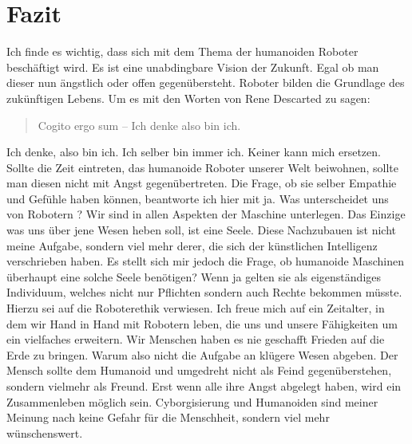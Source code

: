 
\newpage

\chapter{Fazit}
Ich finde es wichtig, dass sich mit dem Thema der humanoiden Roboter beschäftigt wird. Es ist eine unabdingbare Vision der Zukunft. Egal ob man dieser nun ängstlich oder offen gegenübersteht. Roboter bilden die Grundlage des zukünftigen Lebens. Um es mit den Worten von Rene Descarted zu sagen: 
\begin{quote}
	Cogito ergo sum – Ich denke also bin ich.
\end{quote}
Ich denke, also bin ich. Ich selber bin immer ich. Keiner kann mich ersetzen. Sollte die Zeit eintreten, das humanoide Roboter unserer Welt beiwohnen, sollte man diesen nicht mit Angst gegenübertreten. Die Frage, ob sie selber Empathie und Gefühle haben können, beantworte ich hier mit ja. Was unterscheidet uns von Robotern ? Wir sind in allen Aspekten der Maschine unterlegen. Das Einzige was uns über jene Wesen heben soll, ist eine Seele. Diese Nachzubauen ist nicht meine Aufgabe, sondern viel mehr derer, die sich der künstlichen Intelligenz verschrieben haben. Es stellt sich mir jedoch die Frage, ob humanoide Maschinen überhaupt eine solche Seele benötigen? Wenn ja gelten sie als eigenständiges Individuum, welches nicht nur Pflichten sondern auch Rechte bekommen müsste. Hierzu sei auf die Roboterethik verwiesen. Ich freue mich auf ein Zeitalter, in dem wir Hand in Hand mit Robotern leben, die uns und unsere Fähigkeiten um ein vielfaches erweitern. Wir Menschen haben es nie geschafft Frieden auf die Erde zu bringen. Warum also nicht die Aufgabe an klügere Wesen abgeben. Der Mensch sollte dem Humanoid und umgedreht nicht als Feind gegenüberstehen, sondern vielmehr als Freund. Erst wenn alle ihre Angst abgelegt haben, wird ein Zusammenleben möglich sein. Cyborgisierung und Humanoiden sind meiner Meinung nach keine Gefahr für die Menschheit, sondern viel mehr wünschenswert.